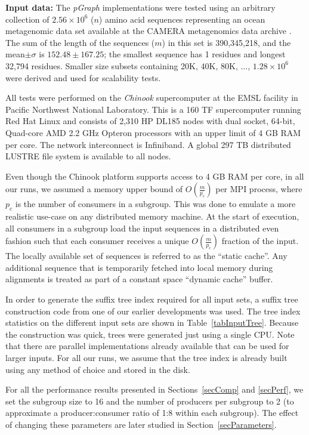 \documentclass[10pt,journal,letterpaper,compsoc]{IEEEtran}
\begin{document}
{\bf Input data:} The {\it pGraph} implementations were tested using an arbitrary collection of $2.56\times 10^6$ ($n$) amino acid sequences representing an ocean metagenomic data set available at the CAMERA metagenomics data archive \cite{}. The sum of the length of the sequences ($m$) in this set is 390,345,218, and the mean$\pm\sigma$ is $152.48\pm 167.25$; the smallest sequence has 1 residues and longest 32,794 residues. Smaller size subsets containing 20K, 40K, 80K, $\ldots$, $1.28\times 10^6$  were derived and used for scalability tests.

 All tests were performed on the {\it Chinook} supercomputer at the EMSL facility in Pacific Northwest National Laboratory. This is a 160 TF supercomputer running Red Hat Linux and consists of 2,310 HP DL185 nodes with dual socket, 64-bit, Quad-core AMD 2.2 GHz Opteron processors with an upper limit of 4 GB RAM per core. The network interconnect is Infiniband. A global 297 TB distributed LUSTRE file system is available to all nodes. 


 Even though the Chinook platform supports access to 4 GB RAM per core, in all our runs, we assumed a memory upper bound of $O(\frac{m}{p_c})$ per MPI process, where $p_c$ is the number of consumers in a subgroup. This was done to emulate a more realistic use-case on any distributed memory machine. At the start of execution, all consumers in a subgroup load the input sequences in a distributed even fashion such that each consumer receives a unique $O(\frac{m}{p_c})$ fraction of the input. The locally available set of sequences is referred to as the ``static cache''. Any additional sequence that is temporarily fetched into local memory during alignments is treated as part of a constant space ``dynamic cache'' buffer.

In order to generate the suffix tree index required for all input sets, a suffix tree construction code from one of our earlier developments \cite{Kalyanaraman07} was used. The tree index statistics on the different input sets are shown in Table~\ref{tabInputTree}. Because the construction was quick, trees were generated just using a single CPU. Note that there are parallel implementations \cite{Kalyanaraman07,Ghoting09} already available that can be used for larger inputs. For all our runs, we assume that the tree index is already built using any method of choice and stored in the disk.

For all the performance results presented in Sections~\ref{secComp} and \ref{secPerf}, we set the subgroup size to 16 and the number of producers per subgroup to 2 (to approximate a producer:consumer ratio of 1:8 within each subgroup). The effect of changing these parameters are later studied in Section~\ref{secParameters}.
\end{document}
